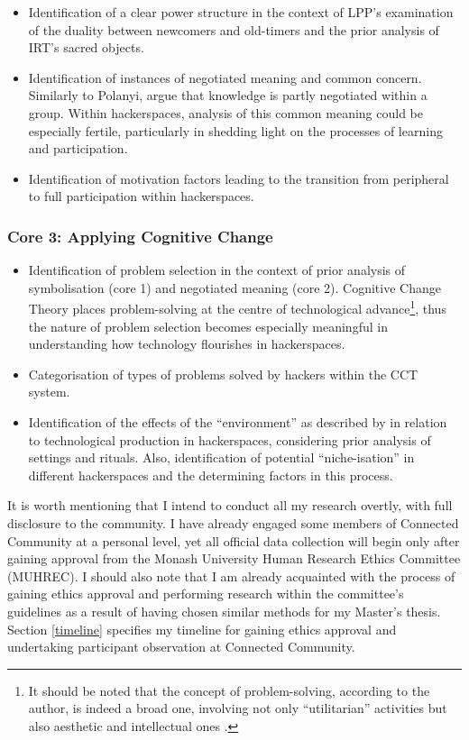 \begin{itemize}
  \item Identification of a clear power structure in the context of LPP's examination of the duality between newcomers and old-timers and the prior analysis of IRT's sacred objects.
  \item Identification of instances of negotiated meaning and common concern. Similarly to Polanyi, \citeauthor{lave91} argue that knowledge is partly negotiated within a group. Within hackerspaces, analysis of this common meaning could be especially fertile, particularly in shedding light on the processes of learning and participation.
  \item Identification of motivation factors leading to the transition from peripheral to full participation within hackerspaces.
\end{itemize}

\subsubsection{Core 3: Applying Cognitive Change}

\begin{itemize}
  \item Identification of problem selection in the context of prior analysis of symbolisation (core 1) and negotiated meaning (core 2). Cognitive Change Theory places problem-solving at the centre of technological advance\footnote{It should be noted that the concept of problem-solving, according to the author, is indeed a broad one, involving not only ``utilitarian'' activities but also aesthetic and intellectual ones \citep[p.84]{laudan84}.}, thus the nature of problem selection becomes especially meaningful in understanding how technology flourishes in hackerspaces.
  \item Categorisation of types of problems solved by hackers within the CCT system.
  \item Identification of the effects of the ``environment'' as described by \citet[p.101]{laudan84} in relation to technological production in hackerspaces, considering prior analysis of settings and rituals. Also, identification of potential ``niche-isation'' in different hackerspaces and the determining factors in this process.
\end{itemize}

It is worth mentioning that I intend to conduct all my research overtly, with full disclosure to the community. I have already engaged some members of Connected Community at a personal level, yet all official data collection will begin only after gaining approval from the Monash University Human Research Ethics Committee (MUHREC). I should also note that I am already acquainted with the process of gaining ethics approval and performing research within the committee's guidelines as a result of having chosen similar methods for my Master's thesis. Section \ref{timeline} specifies my timeline for gaining ethics approval and undertaking participant observation at Connected Community.


